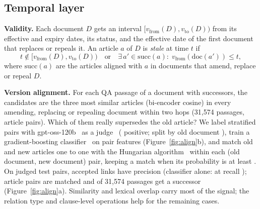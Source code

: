 \documentclass{article} %
\begin{document}
\subsection{Temporal layer}
\label{sec:temporal}
\textbf{Validity.} Each document $D$ gets an interval $[v_{\mathrm{from}}(D), v_{\mathrm{to}}(D))$ from its effective and
expiry dates, its status, and the effective date of the first document that replaces or repeals it. An article $a$ of
$D$ is \emph{stale} at time $t$ if
\[
t \notin [v_{\mathrm{from}}(D), v_{\mathrm{to}}(D)) \quad \text{or} \quad \exists\, a' \in \mathrm{succ}(a):\;
v_{\mathrm{from}}(\mathrm{doc}(a')) \leq t ,
\]
where $\mathrm{succ}(a)$ are the articles aligned with $a$ in documents that amend, replace or repeal $D$.

\textbf{Version alignment.} For each QA passage of a document with successors, the candidates are the three most
similar articles (bi-encoder cosine) in every amending, replacing or repealing document within two hops (31,574
passages, \ResAlignArtPairs{} article pairs). Which of them really supersedes the old article? We label
\ResAlignJudged{} stratified pairs with gpt-oss-120b~\citep{gptoss2025} as a judge~\citep{zheng2023judge}
(\AlPosRate{} positive; split by old document \AlSplits), train a gradient-boosting classifier~\citep{friedman2001gbm}
on pair features (Figure~\ref{fig:align}b), and match old and new articles one to one with the Hungarian
algorithm~\citep{kuhn1955hungarian} within each (old document, new document) pair, keeping a match when its
probability is at least \ResAlignThr. On judged test pairs, accepted links have precision \ResAlignPrec{} (classifier
alone: \AlClsP{} at recall \AlClsR); \ResAlignArtAccepted{} article pairs are matched and \ResAlignAccepted{} of 31,574
passages get a successor (Figure~\ref{fig:align}a). Similarity and lexical overlap carry most of the signal; the
relation type and clause-level operations help for the remaining cases.
\end{document}
